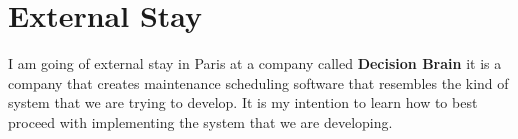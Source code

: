 \section{External Stay}
I am going of external stay in Paris at a company called \textbf{Decision Brain} it is a 
company that creates maintenance scheduling software that resembles the kind of system 
that we are trying to develop. It is my intention to learn how to
best proceed with implementing the system that we are developing.
